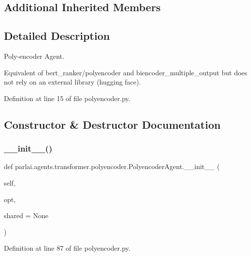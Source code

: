 \subsection*{Additional Inherited Members}


\subsection{Detailed Description}
\begin{DoxyVerb}Poly-encoder Agent.

Equivalent of bert_ranker/polyencoder and biencoder_multiple_output
but does not rely on an external library (hugging face).
\end{DoxyVerb}
 

Definition at line 15 of file polyencoder.\+py.



\subsection{Constructor \& Destructor Documentation}
\mbox{\label{classparlai_1_1agents_1_1transformer_1_1polyencoder_1_1PolyencoderAgent_a2e8f1aca19a3ba34386d7c69ed7e17bc}} 
\subsubsection{\texorpdfstring{\+\_\+\+\_\+init\+\_\+\+\_\+()}{\_\_init\_\_()}}
{\footnotesize\ttfamily def parlai.\+agents.\+transformer.\+polyencoder.\+Polyencoder\+Agent.\+\_\+\+\_\+init\+\_\+\+\_\+ (\begin{DoxyParamCaption}\item[{}]{self,  }\item[{}]{opt,  }\item[{}]{shared = {\ttfamily None} }\end{DoxyParamCaption})}



Definition at line 87 of file polyencoder.\+py.



